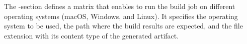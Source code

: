 \noindent The -section defines a matrix that enables to run the build job on different operating systems 
(macOS, Windows, and Linux). It specifies the operating system to be used, the path where the build results are 
expected, and the file extension with its content type of the generated artifact.

